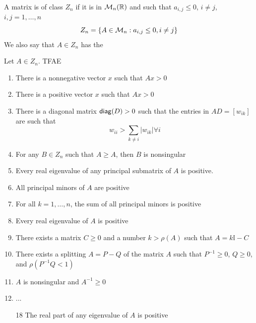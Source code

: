 \documentclass[aspectratio=169]{beamer}
\begin{document}
\begin{frame}
\begin{definition}
A matrix is of class $Z_n$ if it is in $\mathcal{M}_n(\mathbb{R})$ and such that $a_{i,j}\leq 0$, $i \neq j$, $i,j=1,\ldots,n$
\[
    Z_n=\{A\in \mathcal{M}_n: a_{i,j}\leq 0, i\neq j\}
\]
We also say that $A\in Z_n$ has the 
\end{definition}
\end{frame}


\begin{frame}
\begin{theorem}
Let $A\in Z_n$. TFAE
\begin{enumerate}
    \item There is a nonnegative vector $x$ such that $Ax>0$
    \item There is a positive vector $x$ such that $Ax>0$
    \item There is a diagonal matrix $\mathsf{diag}(D)>0$ such that the entries in $AD=[w_{ik}]$ are such that 
    \[w_{ii}> \sum\limits_{k\neq i} | w_{ik}| \forall i\]
    \item For any $B\in Z_n$ such that $A\geq A$, then $B$ is nonsingular 
    \item Every real eigenvalue of any principal submatrix of $A$ is positive.
    \item All principal minors of $A$ are positive
\end{enumerate}
\end{theorem}
\end{frame}

\begin{frame}
\addtocounter{theorem}{-1}
\begin{theorem}[Continued]
\begin{enumerate}
    \setcounter{enumi}{6}
    \item For all $k= 1, \dots, n$, the sum of all principal minors is positive
    \item Every real eigenvalue of $A$ is positive
    \item There exists a matrix $C\geq 0$ and a number $k > \rho(A)$ such that $A= k\mathbb{I}-C$
    \item There exists a splitting $A=P-Q$ of the matrix $A$ such that $P^{-1}\geq 0$, $Q\geq 0$, and $\rho(P^{-1}Q<1)$
    \item $A$ is nonsingular and $A^{-1}\geq 0$
    \item ...
    \item[18] The real part of any eigenvalue of $A$ is positive
\end{enumerate}
\end{theorem}
\end{frame}
\end{document}
